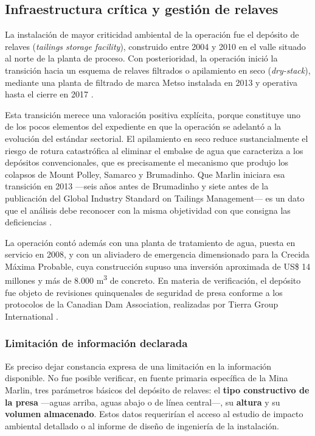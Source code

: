 \subsection{Infraestructura crítica y gestión de relaves}

La instalación de mayor criticidad ambiental de la operación fue el depósito de
relaves (\textit{tailings storage facility}), construido entre 2004 y 2010 en el
valle situado al norte de la planta de proceso. Con posterioridad, la operación
inició la transición hacia un esquema de relaves filtrados o apilamiento en seco
(\textit{dry-stack}), mediante una planta de filtrado de marca Metso instalada en
2013 y operativa hasta el cierre en 2017 \parencite{sec2011ni43101}.

Esta transición merece una valoración positiva explícita, porque constituye uno de
los pocos elementos del expediente en que la operación se adelantó a la evolución
del estándar sectorial. El apilamiento en seco reduce sustancialmente el riesgo
de rotura catastrófica al eliminar el embalse de agua que caracteriza a los
depósitos convencionales, que es precisamente el mecanismo que produjo los
colapsos de Mount Polley, Samarco y Brumadinho. Que Marlin iniciara esa
transición en 2013 —seis años antes de Brumadinho y siete antes de la publicación
del Global Industry Standard on Tailings Management— es un dato que el análisis
debe reconocer con la misma objetividad con que consigna las deficiencias
\parencite{icmm2020gistm}.

La operación contó además con una planta de tratamiento de agua, puesta en
servicio en 2008, y con un aliviadero de emergencia dimensionado para la Crecida
Máxima Probable, cuya construcción supuso una inversión aproximada de US\$ 14
millones y más de 8.000 m\textsuperscript{3} de concreto. En materia de
verificación, el depósito fue objeto de revisiones quinquenales de seguridad de
presa conforme a los protocolos de la Canadian Dam Association, realizadas por
Tierra Group International \parencite{sec2011ni43101}.

\subsubsection{Limitación de información declarada}

Es preciso dejar constancia expresa de una limitación en la información
disponible. No fue posible verificar, en fuente primaria específica de la Mina
Marlin, tres parámetros básicos del depósito de relaves: el \textbf{tipo
constructivo de la presa} —aguas arriba, aguas abajo o de línea central—, su
\textbf{altura} y su \textbf{volumen almacenado}. Estos datos requerirían el
acceso al estudio de impacto ambiental detallado o al informe de diseño de
ingeniería de la instalación.

